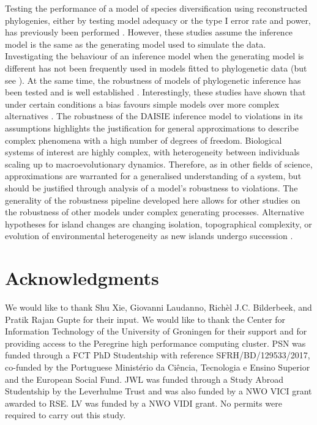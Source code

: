 \documentclass{article}
\begin{document}
Testing the performance of a model of species diversification using reconstructed phylogenies, either by testing model adequacy or the type I error rate and power, has previously been performed \citep{davis_exploring_2013, pennell_model_2015, rabosky_model_2015, etienne_how_2016}. However, these studies assume the inference model is the same as the generating model used to simulate the data. Investigating the behaviour of an inference model when the generating model is different has not been frequently used in models fitted to phylogenetic data (but see \cite{simonet_robustness_2018}). At the same time, the robustness of models of phylogenetic inference has been tested and is well established \citep{huelsenbeck_performance_1995, bilderbeek_quantifying_2021}. Interestingly, these studies have shown that under certain conditions a bias favours simple models over more complex alternatives \citep{yang_how_1997, bruno_topological_1999}. The robustness of the DAISIE inference model to violations in its assumptions highlights the justification for general approximations to describe complex phenomena with a high number of degrees of freedom. Biological systems of interest are highly complex, with heterogeneity between individuals scaling up to macroevolutionary dynamics. Therefore, as in other fields of science, approximations are warranted for a generalised understanding of a system, but should be justified through analysis of a model’s robustness to violations. The generality of the robustness pipeline developed here allows for other studies on the robustness of other models under complex generating processes. Alternative hypotheses for island changes are changing isolation, topographical complexity, or evolution of environmental heterogeneity as new islands undergo succession \citep{massol_island_2017, barajasbarbosa_environmental_2020}.

\section*{Acknowledgments}

We would like to thank Shu Xie, Giovanni Laudanno, Richèl J.C. Bilderbeek, and Pratik Rajan Gupte for their input. We would like to thank the Center for Information Technology of the University of Groningen for their support and for providing access to the Peregrine high performance computing cluster. PSN was funded through a FCT PhD Studentship with reference SFRH/BD/129533/2017, co-funded by the Portuguese Ministério da Ciência, Tecnologia e Ensino Superior and the European Social Fund. JWL was funded through a Study Abroad Studentship by the Leverhulme Trust and was also funded by a NWO VICI grant awarded to RSE. LV was funded by a NWO VIDI grant. No permits were required to carry out this study.
\end{document}
